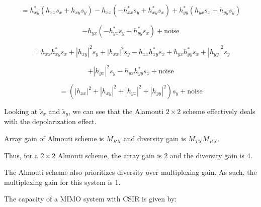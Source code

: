 \documentclass[fleqn]{article}
\begin{document}
\begin{enumerate}
		\begin{equation*}
			= h_{xy}^*(h_{xx}s_x + h_{xy}s_y) - h_{xx}(-h_{xx}^*s_y + h_{xy}^*s_x) + h_{yy}^*(h_{yx}s_x + h_{yy}s_y)
		\end{equation*}
		
		\begin{equation*}
			- h_{yx}(-h_{yx}^*s_y + h_{yy}^*s_x) + \text{noise}
		\end{equation*}
		
		\begin{equation*}
			= h_{xx}h_{xy}^*s_x + |h_{xy}|^2s_y + |h_{xx}|^2s_y - h_{xx}h_{xy}^*s_x + h_{yx}h_{yy}^*s_x + |h_{yy}|^2s_y
		\end{equation*}
		
		\begin{equation*}
			+ |h_{yx}|^2s_y - h_{yx}h_{yy}^*s_x + \text{noise}
		\end{equation*}
		
		\begin{equation*}
			= (|h_{xx}|^2 + |h_{xy}|^2 + |h_{yx}|^2 + |h_{yy}|^2)s_y + \text{noise}
		\end{equation*}
		
		Looking at $\tilde{s}_x$ and $\tilde{s}_y$, we can see that the Alamouti $2\times 2$ scheme effectively deals with the depolarization effect.
		
		\pagebreak
		
%		
%		

		Array gain of Almouti scheme is $M_{RX}$ and diversity gain is $M_{TX}M_{RX}$.
		
		Thus, for a $2 \times 2$ Almouti scheme, the array gain is 2 and the diversity gain is 4.
		
		The Almouti scheme also prioritizes diversity over multiplexing gain. As such, the multiplexing gain for this system is 1.	
		
		The capacity of a MIMO system with CSIR is given by:
		
%			
		

\end{enumerate}
\end{document}
